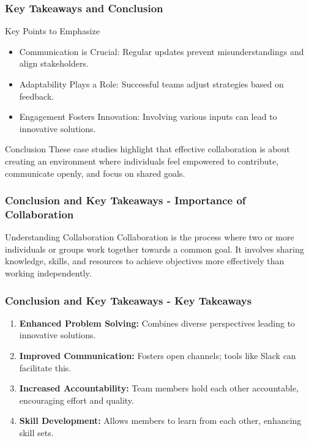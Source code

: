 \documentclass[aspectratio=169]{beamer}
\begin{document}
\begin{frame}[fragile]
    \frametitle{Key Takeaways and Conclusion}
    \begin{block}{Key Points to Emphasize}
        \begin{itemize}
            \item Communication is Crucial: Regular updates prevent misunderstandings and align stakeholders.
            \item Adaptability Plays a Role: Successful teams adjust strategies based on feedback.
            \item Engagement Fosters Innovation: Involving various inputs can lead to innovative solutions.
        \end{itemize}
    \end{block}

    \begin{block}{Conclusion}
        These case studies highlight that effective collaboration is about creating an environment where individuals feel empowered to contribute, communicate openly, and focus on shared goals. 
    \end{block}
\end{frame}

\begin{frame}[fragile]
    \frametitle{Conclusion and Key Takeaways - Importance of Collaboration}
    \begin{block}{Understanding Collaboration}
        Collaboration is the process where two or more individuals or groups work together towards a common goal. It involves sharing knowledge, skills, and resources to achieve objectives more effectively than working independently.
    \end{block}
\end{frame}

\begin{frame}[fragile]
    \frametitle{Conclusion and Key Takeaways - Key Takeaways}
    \begin{enumerate}
        \item \textbf{Enhanced Problem Solving:} Combines diverse perspectives leading to innovative solutions.
        \item \textbf{Improved Communication:} Fosters open channels; tools like Slack can facilitate this.
        \item \textbf{Increased Accountability:} Team members hold each other accountable, encouraging effort and quality.
        \item \textbf{Skill Development:} Allows members to learn from each other, enhancing skill sets.
    \end{enumerate}
\end{frame}
\end{document}
